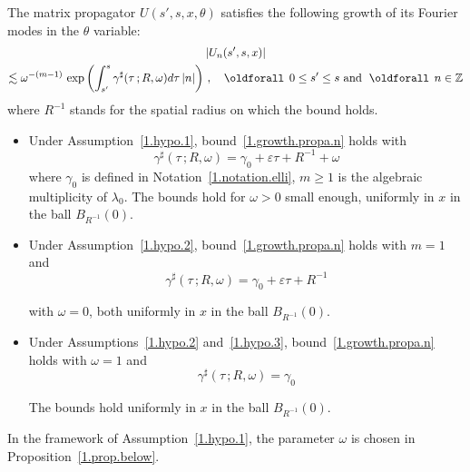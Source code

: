 \documentclass[AHL,Unicode,longabstracts,published]{cedram}
\theoremstyle{plain}
\newcommand*\e{\varepsilon}
\newcommand*\Z{{\mathbb Z}}
\newcommand*\g{\gamma}
\renewcommand*{\forall}{\mathrel{\oldforall}}
\begin{document}
\begin{lemm}\label{1.lemma.growth.propa}
The matrix propagator $U(s',s,x,\theta)$ satisfies the following growth of its Fourier modes in the $\theta$ variable:
\begin{multline}\label{1.growth.propa.n}
|U_n(s',s,x)|\\ 
\lesssim \omega^{-(m-1)}\,\exp\left(\int_{s'}^{s} \g^{\sharp}(\tau \,;R,\omega) d\tau \, |n|\right)\,, \quad \forall \, 0 \leq s' \leq s \text{ and } \forall \, n\in\Z
\end{multline}
where $R^{-1}$ stands for the spatial radius on which the bound holds.
\begin{itemize}
\item Under Assumption~\ref{1.hypo.1}, bound~\eqref{1.growth.propa.n} holds with
\begin{equation}\label{1.bound.g.sharp}
\g^{\sharp}(\tau \,;R,\omega) = \g_0 + \e \tau + R^{-1} + \omega
\end{equation}
 where $\g_0$ is defined in Notation~\ref{1.notation.elli}, $m \geq 1$ is the algebraic multiplicity of $\lambda_0$. The bounds hold for $\omega >0$ small enough, uniformly in $x$ in the ball $B_{R^{-1}}(0)$.

\item Under Assumption~\ref{1.hypo.2}, bound~\eqref{1.growth.propa.n} holds with $ m =1$ and
\begin{equation}\label{1.bound.g.sharp.bis}
\g^{\sharp}(\tau \,;R,\omega) = \g_0 + \e \tau + R^{-1}
\end{equation}

\noindent with $\omega = 0$, both uniformly in $x$ in the ball $B_{R^{-1}}(0)$.

\item Under Assumptions~\ref{1.hypo.2} and~\ref{1.hypo.3}, bound~\eqref{1.growth.propa.n} holds with $\omega = 1$ and
\begin{equation}\label{1.bound.g.sharp.max}
\g^{\sharp}(\tau \,;R,\omega) = \g_0
\end{equation}

\noindent The bounds hold uniformly in $x$ in the ball $B_{R^{-1}}(0)$.
\end{itemize}
\end{lemm}


In the framework of Assumption~\ref{1.hypo.1}, the parameter $\omega$ is chosen in Proposition~\ref{1.prop.below}.
\end{document}
